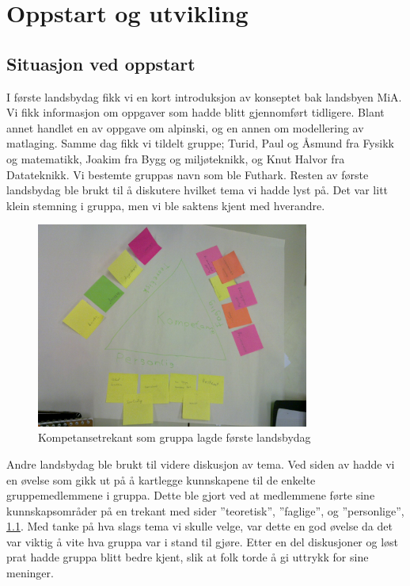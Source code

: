 
\chapter{Oppstart og utvikling}

\section{Situasjon ved oppstart}

I første landsbydag fikk vi en kort introduksjon av konseptet bak landsbyen MiA.
Vi fikk informasjon om oppgaver som hadde blitt gjennomført tidligere. Blant
annet handlet en av oppgave om alpinski, og en annen om modellering av
matlaging. Samme dag fikk vi tildelt gruppe; Turid, Paul og Åsmund fra Fysikk og
matematikk, Joakim fra Bygg og miljøteknikk, og Knut Halvor fra Datateknikk. Vi
bestemte gruppas navn som ble Futhark. Resten av første landsbydag ble brukt
til å diskutere hvilket tema vi hadde lyst på. Det var litt klein stemning i
gruppa, men vi ble saktens kjent med hverandre. 

\begin{figure}[h!]
  \begin{center}
    \includegraphics[width=0.8\textwidth]{kompetansetrekant.jpg}
  \end{center}
  \caption{Kompetansetrekant som gruppa lagde første landsbydag}
  \label{fig:kompetansetrekant}
\end{figure}

Andre landsbydag ble brukt til videre diskusjon av tema. Ved siden av hadde vi
en øvelse som gikk ut på å kartlegge kunnskapene til de enkelte gruppemedlemmene
i gruppa. Dette ble gjort ved at medlemmene førte sine kunnskapsområder på
en trekant med sider ”teoretisk”, ”faglige”, og ”personlige”,
\cref{fig:kompetansetrekant}. Med tanke på hva slags tema vi skulle velge, var
dette en god øvelse da
det var viktig å vite hva gruppa var i stand til gjøre. Etter en del diskusjoner
og løst prat hadde gruppa blitt bedre kjent, slik at folk torde å gi uttrykk for sine 
meninger.
 
